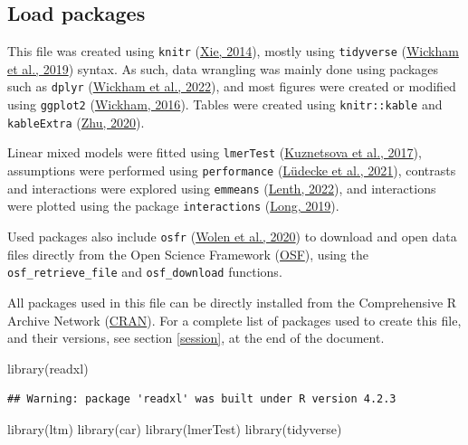\documentclass[
  bookmarksnumbered]{article}
\newenvironment{Shaded}{\begin{snugshade}}{\end{snugshade}}
\newcommand{\FunctionTok}[1]{\textcolor[rgb]{0.94,0.94,0.56}{#1}}
\newcommand{\NormalTok}[1]{\textcolor[rgb]{0.80,0.80,0.80}{#1}}
\begin{document}
\hypertarget{load-packages}{%
\subsection{Load packages}\label{load-packages}}

This file was created using \texttt{knitr} (\protect\hyperlink{ref-knitrcit}{Xie, 2014}), mostly using \texttt{tidyverse} (\protect\hyperlink{ref-tidyversecit}{Wickham et al., 2019}) syntax. As such, data wrangling was mainly done using packages such as \texttt{dplyr} (\protect\hyperlink{ref-dplyrcit}{Wickham et al., 2022}), and most figures were created or modified using \texttt{ggplot2} (\protect\hyperlink{ref-ggplotcit}{Wickham, 2016}). Tables were created using \texttt{knitr::kable} and \texttt{kableExtra} (\protect\hyperlink{ref-kableExtracit}{Zhu, 2020}).

Linear mixed models were fitted using \texttt{lmerTest} (\protect\hyperlink{ref-lmertestcit}{Kuznetsova et al., 2017}), assumptions were performed using \texttt{performance} (\protect\hyperlink{ref-ludecke2021}{Lüdecke et al., 2021}), contrasts and interactions were explored using \texttt{emmeans} (\protect\hyperlink{ref-emmeanscit}{Lenth, 2022}), and interactions were plotted using the package \texttt{interactions} (\protect\hyperlink{ref-interactionscit}{Long, 2019}).

Used packages also include \texttt{osfr} (\protect\hyperlink{ref-osfrcit}{Wolen et al., 2020}) to download and open data files directly from the Open Science Framework (\href{https://osf.io/}{OSF}), using the \texttt{osf\_retrieve\_file} and \texttt{osf\_download} functions.

All packages used in this file can be directly installed from the Comprehensive R Archive Network (\href{https://cran.r-project.org/}{CRAN}). For a complete list of packages used to create this file, and their versions, see section \ref{session}, at the end of the document.

\begin{Shaded}
\begin{Highlighting}[]
\FunctionTok{library}\NormalTok{(readxl)}
\end{Highlighting}
\end{Shaded}

\begin{verbatim}
## Warning: package 'readxl' was built under R version 4.2.3
\end{verbatim}

\begin{Shaded}
\begin{Highlighting}[]
\FunctionTok{library}\NormalTok{(ltm)}
\FunctionTok{library}\NormalTok{(car)}
\FunctionTok{library}\NormalTok{(lmerTest)}
\FunctionTok{library}\NormalTok{(tidyverse)}
\end{Highlighting}
\end{Shaded}
\end{document}
